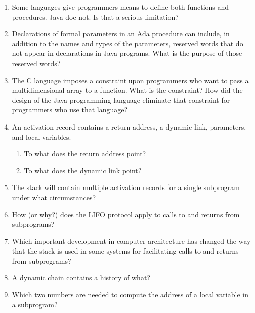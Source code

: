 \begin{enumerate}
\begin{answer}
  \end{answer}

  \item Some languages give programmers means to define
    both functions and procedures. Java doe not. Is that
    a serious limitation?

  \begin{answer}
   
  \end{answer}

  \item Declarations of formal parameters in an Ada procedure
    can include, in addition to the names and types of the
    parameters, reserved words that do not appear in declarations
    in Java programs. 
    What is the purpose of those reserved words?
 
  \item The C language imposes a constraint upon programmers
    who want to pass a multidimensional array to a function.
    What is the constraint? How did the design of the Java
    programming language eliminate that constraint for 
    programmers who use that language?

  \item An activation record contains a return
    address, a dynamic link, parameters, and
    local variables.
  \begin{enumerate}
    \item To what does the return address point?
    \item To what does the dynamic link point?
    \end{enumerate}

  \item The stack will contain multiple activation
    records for a single subprogram under what
    circumstances?

  \item How (or why?) does the LIFO protocol apply to
    calls to and returns from subprograms?

  \item Which important development in computer architecture
    has changed the way that the stack is used in some
    systems for facilitating calls to and returns from
    subprograms?

  \item A dynamic chain contains a history of what?

  \item Which two numbers are needed to compute
    the address of a local variable in a subprogram?


\end{enumerate}
